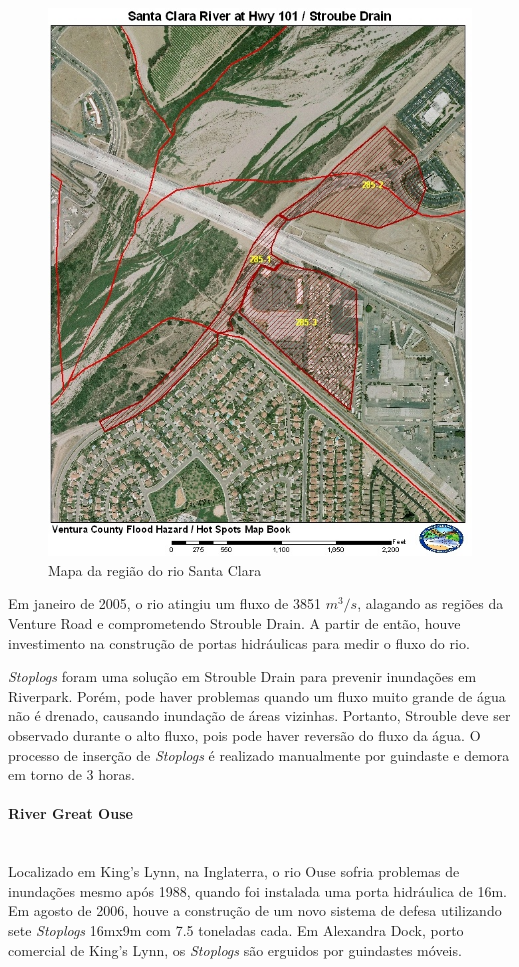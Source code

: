\begin{figure}[H]
    \centering
    \includegraphics[width=0.5\columnwidth]{figs/pesqbib/1.jpg}
    \caption{Mapa da região do rio Santa Clara}
    \label{pesqbib_1}
\end{figure}
 
Em janeiro de 2005, o rio atingiu um fluxo de 3851 $m^3/s$, alagando as regiões
da Venture Road e comprometendo Strouble Drain. A partir de então, houve
investimento na construção de portas hidráulicas para medir o fluxo do rio. 

 \emph{Stoplogs} foram uma solução em Strouble Drain para prevenir inundações em Riverpark. Porém, pode haver problemas quando um fluxo muito grande de água não é drenado, causando inundação de áreas vizinhas. Portanto, Strouble deve ser observado durante o alto fluxo, pois pode haver reversão do fluxo da água. O processo de inserção de  \emph{Stoplogs} é realizado manualmente por guindaste e demora em torno de 3 horas.

\paragraph{River Great Ouse}\mbox{}\\
Localizado em King’s Lynn, na Inglaterra, o rio Ouse sofria problemas de inundações mesmo após 1988, quando foi instalada uma porta hidráulica de 16m. Em agosto de 2006, houve a construção de um novo sistema de defesa utilizando sete  \emph{Stoplogs} 16mx9m com 7.5 toneladas cada. Em Alexandra Dock, porto comercial de King’s Lynn, os \emph{Stoplogs} são erguidos por guindastes móveis.

